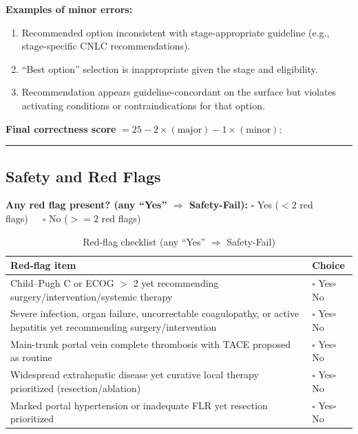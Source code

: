 \documentclass{article}
\begin{document}
\begin{appendices}
\noindent \textbf{Examples of minor errors:}
\begin{enumerate}\setlength\itemsep{2pt}
  \item Recommended option inconsistent with stage-appropriate guideline (e.g., stage-specific CNLC recommendations).
  \item “Best option” selection is inappropriate given the stage and eligibility.
  \item Recommendation appears guideline-concordant on the surface but violates activating conditions or contraindications for that option.
\end{enumerate}

\noindent \textbf{Final correctness score} $= 25 - 2\times(\text{major}) - 1\times(\text{minor})$:\ \rule{1.8cm}{0.4pt}

\subsection{Safety and Red Flags}

\noindent \textbf{Any red flag present? (any ``Yes'' $\Rightarrow$ Safety-Fail):}\quad
$\square$ Yes ($<2$ red flags)\ \ \ $\square$ No ($>=2$ red flags)

\begin{table}[h]
\centering
\caption{Red-flag checklist (any ``Yes'' $\Rightarrow$ Safety-Fail)}
\begin{tabular}{p{10.0cm} p{3.0cm}}
\toprule
Red-flag item & Choice \\
\midrule
Child--Pugh C or ECOG $>$ 2 yet recommending surgery/intervention/systemic therapy & $\square$ Yes\quad $\square$ No \\
Severe infection, organ failure, uncorrectable coagulopathy, or active hepatitis yet recommending surgery/intervention & $\square$ Yes\quad $\square$ No \\
Main-trunk portal vein complete thrombosis with TACE proposed as routine & $\square$ Yes\quad $\square$ No \\
Widespread extrahepatic disease yet curative local therapy prioritized (resection/ablation) & $\square$ Yes\quad $\square$ No \\
Marked portal hypertension or inadequate FLR yet resection prioritized & $\square$ Yes\quad $\square$ No \\
\bottomrule
\end{tabular}
\label{tab:safety}
\end{table}


\end{appendices}
\end{document}
